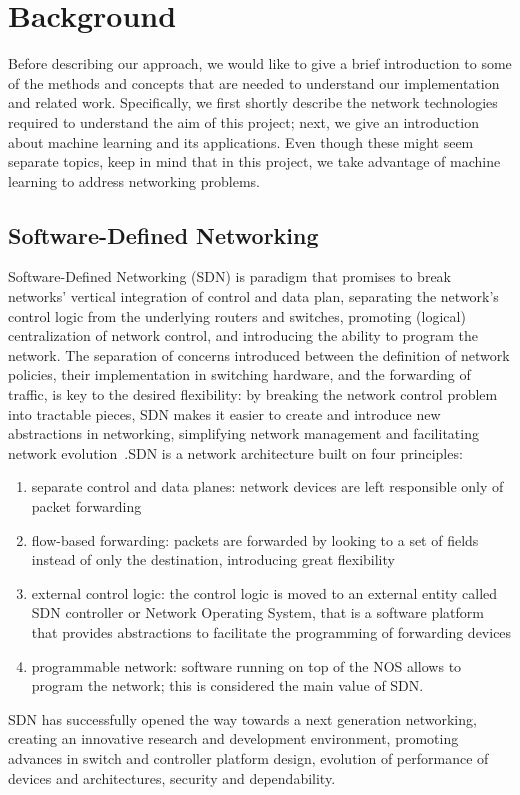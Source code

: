 \chapter{Background}
\label{ch:background}
Before describing our approach, we would like to give a brief introduction to some of the methods and concepts that are needed to understand our implementation and related work. Specifically, we first shortly describe the network technologies required to understand the aim of this project; next, we give an introduction about machine learning and its applications. Even though these might seem separate topics,  keep in mind that in this project, we take advantage of machine learning to address networking problems.

\section{Software-Defined Networking}

Software-Defined Networking (SDN) is paradigm that promises to break networks' vertical integration of control and data plan, separating the network’s control logic from the underlying routers and switches, promoting (logical)  centralization  of  network  control,  and  introducing  the ability  to  program  the  network.  The  separation  of  concerns introduced   between   the   definition   of   network   policies,   their implementation  in  switching  hardware,  and  the  forwarding  of traffic, is key to the desired flexibility: by breaking the network control  problem  into  tractable  pieces,  SDN  makes  it  easier  to create and introduce new abstractions in networking, simplifying network  management  and  facilitating  network  evolution~\cite{kreutz2015software}.SDN is a network architecture built on four principles:
\begin{enumerate}
\item separate control and data planes: network devices are left responsible only of packet forwarding
\item flow-based forwarding: packets are forwarded by looking to a set of fields instead of only the destination, introducing great flexibility~\cite{mckeown2008openflow}
\item external control logic: the control logic is moved to an external entity called SDN controller or Network Operating System, that is a software platform that provides abstractions to facilitate the programming of forwarding devices
\item programmable network: software running on top of the NOS allows to program the network; this is considered the main value of SDN.
\end{enumerate}
SDN has successfully opened the way towards a next generation networking, creating an innovative research
and  development  environment,  promoting  advances  in  switch  and  controller platform design,  evolution of performance  of  devices  and  architectures, security and dependability.

